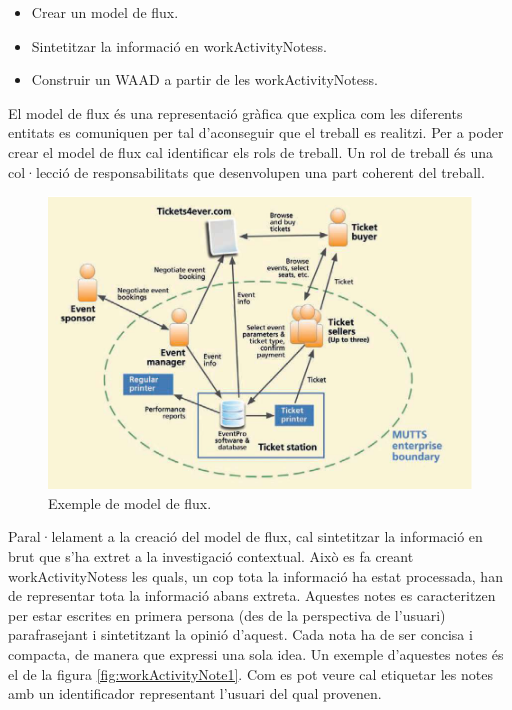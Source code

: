 \begin{itemize}
\item Crear un model de flux.
\item Sintetitzar la informació en \glspl{workActivityNotes}.
\item Construir un \ac{WAAD} a partir de les \glspl{workActivityNotes}.
\end{itemize}

El model de flux és una representació gràfica que explica com les diferents entitats es comuniquen per tal d'aconseguir que el treball es realitzi. Per a poder crear el model de flux cal identificar els rols de treball. Un rol de treball és una col·lecció de responsabilitats que desenvolupen una part coherent del treball.

\begin{figure}[htp]
\centering
\includegraphics[scale=0.6]{flow_model_example.png}
\caption{Exemple de model de flux.}\label{fig:flow_model_example}
\end{figure}

Paral·lelament a la creació del model de flux, cal sintetitzar la informació en brut que s'ha extret a la investigació contextual. Això es fa creant \glspl{workActivityNotes} les quals, un cop tota la informació ha estat processada, han de representar tota la informació abans extreta. Aquestes notes es caracteritzen per estar escrites en primera persona (des de la perspectiva de l'usuari) parafrasejant i sintetitzant la opinió d'aquest. Cada nota ha de ser concisa i compacta, de manera que expressi una sola idea. Un exemple d'aquestes notes és el de la figura \ref{fig:workActivityNote1}. Com es pot veure cal etiquetar les notes amb un identificador representant l'usuari del qual provenen.

